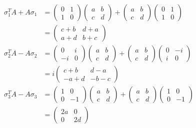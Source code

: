 \documentclass{article}
\begin{document}
\begin{align*}
\sigma_1^T A + A \sigma_1 & = 
	\left( \begin{matrix} 0 & 1 \\ 1 & 0 \end{matrix} \right)
	\left( \begin{matrix} a & b \\ c & d \end{matrix} \right)
	+ 
	\left( \begin{matrix} a & b \\ c & d \end{matrix} \right)
	\left( \begin{matrix} 0 & 1 \\ 1 & 0 \end{matrix} \right)\\
& = \left( \begin{matrix} c + b & d + a \\ a + d & b + c \end{matrix} \right)\\
\sigma_2^T A - A \sigma_2 & = 
	\left( \begin{matrix} 0 & i \\ -i & 0 \end{matrix} \right)
	\left( \begin{matrix} a & b \\ c & d \end{matrix} \right)
	+ 
	\left( \begin{matrix} a & b \\ c & d \end{matrix} \right)
	\left( \begin{matrix} 0 & -i \\ i & 0 \end{matrix} \right)\\
& = i \left( \begin{matrix} c + b & d - a \\ -a + d & - b - c \end{matrix} \right)\\
\sigma_3^T A - A \sigma_3 & = 
	\left( \begin{matrix} 1 & 0 \\ 0 & -1 \end{matrix} \right)
	\left( \begin{matrix} a & b \\ c & d \end{matrix} \right)
	+ 
	\left( \begin{matrix} a & b \\ c & d \end{matrix} \right)
	\left( \begin{matrix} 1 & 0 \\ 0 & -1 \end{matrix} \right)\\
& = \left( \begin{matrix} 2 a & 0 \\ 0 & 2 d \end{matrix} \right)\\
\end{align*}
\end{document}

